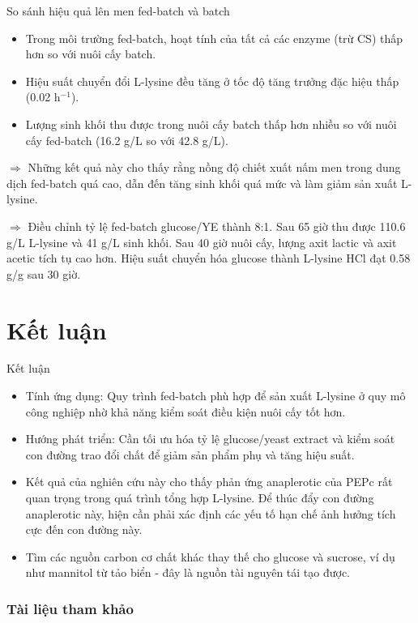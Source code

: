 \documentclass[t]{beamer}
\begin{document}
\begin{frame}{So sánh hiệu quả lên men fed-batch và batch \cite{sassi1998fed}}
	\begin{itemize}
		\item Trong môi trường fed-batch, hoạt tính của tất cả các enzyme (trừ CS) thấp hơn so với nuôi cấy batch.
		\item Hiệu suất chuyển đổi L-lysine đều tăng ở tốc độ tăng trưởng đặc hiệu thấp (0.02 h$^{-1}$).
		\item Lượng sinh khối thu được trong nuôi cấy batch thấp hơn nhiều so với nuôi cấy fed-batch (16.2 g/L so với 42.8 g/L).
	\end{itemize}
	
	\vspace{5pt}
	$\Rightarrow$ Những kết quả này cho thấy rằng nồng độ chiết xuất nấm men trong dung dịch fed-batch quá cao, dẫn đến tăng sinh khối quá mức và làm giảm sản xuất L-lysine.
	
	\vspace{5pt}
	$\Rightarrow$ Điều chỉnh tỷ lệ fed-batch glucose/YE thành 8:1. Sau 65 giờ thu được 110.6 g/L L-lysine  và 41 g/L sinh khối. Sau 40 giờ nuôi cấy, lượng axit lactic và axit acetic tích tụ cao hơn. Hiệu suất chuyển hóa glucose thành L-lysine HCl đạt 0.58 g/g sau 30 giờ.
\end{frame}

\section{Kết luận}

\begin{frame}{Kết luận}
	\begin{itemize}
		\item Tính ứng dụng: Quy trình fed-batch phù hợp để sản xuất L-lysine ở quy mô công nghiệp nhờ khả năng kiểm soát điều kiện nuôi cấy tốt hơn.
		
		\item Hướng phát triển: Cần tối ưu hóa tỷ lệ glucose/yeast extract và kiểm soát con đường trao đổi chất để giảm sản phẩm phụ và tăng hiệu suất.
		
		\item Kết quả của nghiên cứu này cho thấy phản ứng anaplerotic của PEPc rất quan trọng trong quá trình tổng hợp L-lysine. Để thúc đẩy con đường anaplerotic này, hiện cần phải xác định các yếu tố hạn chế ảnh hưởng tích cực đến con đường này.
		
		\item Tìm các nguồn carbon cơ chất khác thay thế cho glucose và sucrose, ví dụ như mannitol từ tảo biển - đây là nguồn tài nguyên tái tạo được.
	\end{itemize}
\end{frame}

\newpage

\begin{frame}[allowframebreaks]
\frametitle{Tài liệu tham khảo}

\printbibliography

\end{frame}
\end{document}
